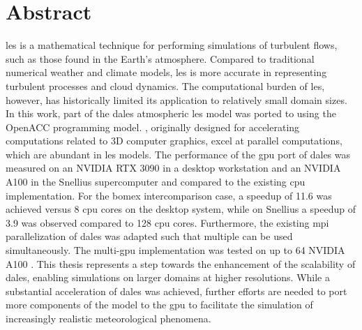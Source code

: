 \chapter*{Abstract}

\acrfull{les} is a mathematical technique for performing simulations of turbulent flows, such as those found in the Earth's atmosphere. Compared to traditional numerical weather and climate models, \acrshort{les} is more accurate in representing turbulent processes and cloud dynamics. The computational burden of \acrshort{les}, however, has historically limited its application to relatively small domain sizes. In this work, part of the \acrshort{dales} atmospheric \acrshort{les} model was ported to  using the OpenACC programming model. , originally designed for accelerating computations related to 3D computer graphics, excel at parallel computations, which are abundant in \acrshort{les} models. The performance of the \acrshort{gpu} port of \acrshort{dales} was measured on an NVIDIA RTX 3090 in a desktop workstation and an NVIDIA A100 in the Snellius supercomputer and compared to the existing \acrshort{cpu} implementation. For the \acrshort{bomex} intercomparison case, a speedup of 11.6 was achieved versus 8 \acrshort{cpu} cores on the desktop system, while on Snellius a speedup of 3.9 was observed compared to 128 \acrshort{cpu} cores. Furthermore, the existing \acrshort{mpi} parallelization of \acrshort{dales} was adapted such that multiple  can be used simultaneously. The multi-\acrshort{gpu} implementation was tested on up to 64 NVIDIA A100 . This thesis represents a step towards the enhancement of the scalability of \acrshort{dales}, enabling simulations on larger domains at higher resolutions. While a substantial acceleration of \acrshort{dales} was achieved, further efforts are needed to port more components of the model to the \acrshort{gpu} to facilitate the simulation of increasingly realistic meteorological phenomena.